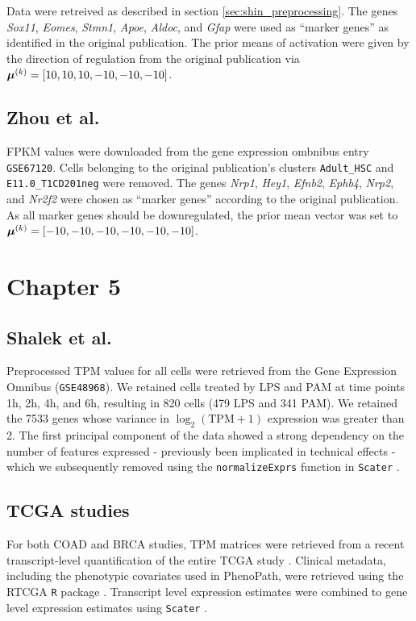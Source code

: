 Data were retreived as described in section \ref{sec:shin_preprocessing}. The genes \emph{Sox11}, \emph{Eomes}, \emph{Stmn1}, \emph{Apoe}, \emph{Aldoc}, and \emph{Gfap} were used as ``marker genes'' as identified in the original publication. The prior means of activation were given by the direction of regulation from the original publication via $\bm{\mu}^{(k)} = [10, 10, 10, -10, -10, -10]$.

\subsection{Zhou et al.}

FPKM values were downloaded from the gene expression ombnibus entry \texttt{GSE67120}. Cells belonging to the original publication's clusters \texttt{Adult\_HSC} and \texttt{E11.0\_T1CD201neg} were removed. The genes \emph{Nrp1}, \emph{Hey1}, \emph{Efnb2}, \emph{Ephb4}, \emph{Nrp2}, and \emph{Nr2f2} were chosen as ``marker genes'' according to the original publication. As all marker genes should be downregulated, the prior mean vector was set to $\bm{\mu}^{(k)} = [-10, -10, -10, -10, -10, -10]$.

\section{Chapter 5} \label{sec:prepclvm}

\subsection{Shalek et al.} \label{sec:prepshalek}

Preprocessed TPM values for all cells were retrieved from the Gene Expression Omnibus (\texttt{GSE48968}). We retained cells treated by LPS and PAM at time points 1h, 2h, 4h, and 6h, resulting in 820 cells (479 LPS and 341 PAM). We retained the 7533 genes whose variance in $\log_2(\text{TPM} + 1)$ expression was greater than 2. The first principal component of the data showed a strong dependency on the number of features expressed - previously been implicated in technical effects \cite{Hicks2015-sw}  - which we subsequently removed using the \texttt{normalizeExprs} function in \texttt{Scater} \cite{McCarthy2017-we}.

\subsection{TCGA studies}

For both COAD and BRCA studies, TPM matrices were retrieved from a recent transcript-level quantification of the entire TCGA study \cite{Tatlow2016-yo}. Clinical metadata, including the phenotypic covariates used in PhenoPath, were retrieved using the RTCGA \texttt{R} package \cite{rtcga}. Transcript level expression estimates were combined to gene level expression estimates using \texttt{Scater} \cite{McCarthy2017-we}.


